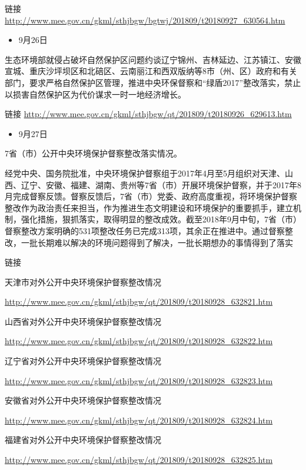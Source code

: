 \documentclass[]{book}
\providecommand{\tightlist}{%
  \setlength{\itemsep}{0pt}\setlength{\parskip}{0pt}}
\begin{document}
链接 \url{http://www.mee.gov.cn/gkml/sthjbgw/bgtwj/201809/t20180927_630564.htm}

\begin{itemize}
\tightlist
\item
  9月26日
\end{itemize}

生态环境部就侵占破坏自然保护区问题约谈辽宁锦州、吉林延边、江苏镇江、安徽宣城、重庆沙坪坝区和北碚区、云南丽江和西双版纳等8市（州、区）政府和有关部门，要求严格自然保护区管理，推进中央环保督察和``绿盾2017''整改落实，禁止以损害自然保护区为代价谋求一时一地经济增长。

链接 \url{http://www.mee.gov.cn/gkml/sthjbgw/qt/201809/t20180926_629613.htm}

\begin{itemize}
\tightlist
\item
  9月27日
\end{itemize}

7省（市）公开中央环境保护督察整改落实情况。

经党中央、国务院批准，中央环境保护督察组于2017年4月至5月组织对天津、山西、辽宁、安徽、福建、湖南、贵州等7省（市）开展环境保护督察，并于2017年8月完成督察反馈。督察反馈后，7省（市）党委、政府高度重视，将环境保护督察整改作为政治责任来担当，作为推进生态文明建设和环境保护的重要抓手，建立机制，强化措施，狠抓落实，取得明显的整改成效。截至2018年9月中旬，7省（市）督察整改方案明确的531项整改任务已完成313项，其余正在推进中。通过督察整改，一批长期难以解决的环境问题得到了解决，一批长期想办的事情得到了落实

链接

天津市对外公开中央环境保护督察整改情况

\url{http://www.mee.gov.cn/gkml/sthjbgw/qt/201809/t20180928_632821.htm}

山西省对外公开中央环境保护督察整改情况

\url{http://www.mee.gov.cn/gkml/sthjbgw/qt/201809/t20180928_632822.htm}

辽宁省对外公开中央环境保护督察整改情况

\url{http://www.mee.gov.cn/gkml/sthjbgw/qt/201809/t20180928_632823.htm}

安徽省对外公开中央环境保护督察整改情况

\url{http://www.mee.gov.cn/gkml/sthjbgw/qt/201809/t20180928_632824.htm}

福建省对外公开中央环境保护督察整改情况

\url{http://www.mee.gov.cn/gkml/sthjbgw/qt/201809/t20180928_632825.htm}
\end{document}
